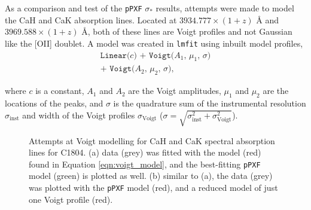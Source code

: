 \documentclass[12pt, twocolumn, nofootinbib]{revtex4-1}    %
\begin{document}
As a comparison and test of the \texttt{pPXF} $\sigma_*$ results, attempts were made to model the CaH and CaK absorption lines. Located at $3934.777\times(1+z)$ {\AA} and $3969.588\times(1+z)$ {\AA}, both of these lines are Voigt profiles and not Gaussian like the [OII] doublet. A model was created in \texttt{lmfit} using inbuilt model profiles,
\begin{multline}
    \texttt{Linear($c$) + Voigt($A_1$, $\mu_1$, $\sigma$)} \\ 
    \texttt{+ Voigt($A_2$, $\mu_2$, $\sigma$)},
    \label{eqn:voigt_model}
\end{multline} 

where $c$ is a constant, $A_1$ and $A_2$ are the Voigt amplitudes, $\mu_1$ and $\mu_2$ are the locations of the peaks, and $\sigma$ is the quadrature sum of the instrumental resolution $\sigma_{\text{inst}}$ and width of the Voigt profiles $\sigma_{\text{Voigt}}$ ($\sigma=\sqrt{\sigma_{\text{inst}}^2 + \sigma_{\text{Voigt}}^2}$). 

\begin{figure}
  \caption[Voigt modelling]{Attempts at Voigt modelling for CaH and CaK spectral absorption lines for C1804. (a) data (grey) was fitted with the model (red) found in Equation \ref{eqn:voigt_model}, and the best-fitting \texttt{pPXF} model (green) is plotted as well. (b) similar to (a), the data (grey) was plotted with the \texttt{pPXF} model (red), and a reduced model of just one Voigt profile (red).}
\end{figure}
\end{document}
